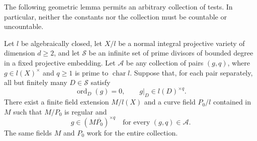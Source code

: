 The following geometric lemma permits an arbitrary collection of tests.
In particular, neither the constants nor the collection must be
countable or uncountable.

\begin{lemma}\label{recovery:incidence}
Let $l$ be algebraically closed, let $X/l$ be a normal integral projective
variety of dimension $d\geq2$, and let $\mathcal S$ be an infinite set
of prime divisors of bounded degree in a fixed projective embedding.
Let $\mathcal A$ be any collection of pairs $(g,q)$, where
$g\in l(X)^\times$ and $q\geq1$ is prime to $\operatorname{char}l$.
Suppose that, for each pair separately, all but finitely many
$D\in\mathcal S$ satisfy
\[
 \operatorname{ord}_D(g)=0,
 \qquad g|_D\in l(D)^{\times q}.
\]
There exist a finite field extension $M/l(X)$ and a curve field
$P_0/l$ contained in $M$ such that $M/P_0$ is regular and
\[
 g\in(M\overline{P_0})^{\times q}
 \quad\text{for every }(g,q)\in\mathcal A.
\]
The same fields $M$ and $P_0$ work for the entire collection.
\end{lemma}

